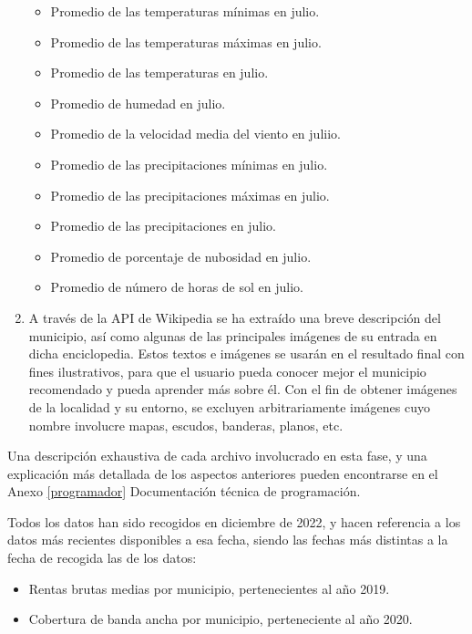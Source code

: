 \begin{enumerate}
\begin{itemize}
        \item Promedio de las temperaturas mínimas en julio.
        \item Promedio de las temperaturas máximas en julio.
        \item Promedio de las temperaturas en julio.
        \item Promedio de humedad en julio.
        \item Promedio de la velocidad media del viento en juliio.
        \item Promedio de las precipitaciones mínimas en julio.
        \item Promedio de las precipitaciones máximas en julio.
        \item Promedio de las precipitaciones en julio.
        \item Promedio de porcentaje de nubosidad en julio.
        \item Promedio de número de horas de sol en julio.
    \end{itemize}

    \item A través de la API de Wikipedia se ha extraído una breve descripción del municipio, así como algunas de las principales imágenes de su entrada en dicha enciclopedia. Estos textos e imágenes se usarán en el resultado final con fines ilustrativos, para que el usuario pueda conocer mejor el municipio recomendado y pueda aprender más sobre él. Con el fin de obtener imágenes de la localidad y su entorno, se excluyen arbitrariamente imágenes cuyo nombre involucre mapas, escudos, banderas, planos, etc.
    
\end{enumerate}

Una descripción exhaustiva de cada archivo involucrado en esta fase, y una explicación más detallada de los aspectos anteriores pueden encontrarse en el Anexo \ref{programador} \guillemotleft Documentación técnica de programación\guillemotright. 

Todos los datos han sido recogidos en diciembre de 2022, y hacen referencia a los datos más recientes disponibles a esa fecha, siendo las fechas más distintas a la fecha de recogida las de los datos:

\begin{itemize}
    \item Rentas brutas medias por municipio, pertenecientes al año 2019.
    \item Cobertura de banda ancha por municipio, perteneciente al año 2020.
\end{itemize}

